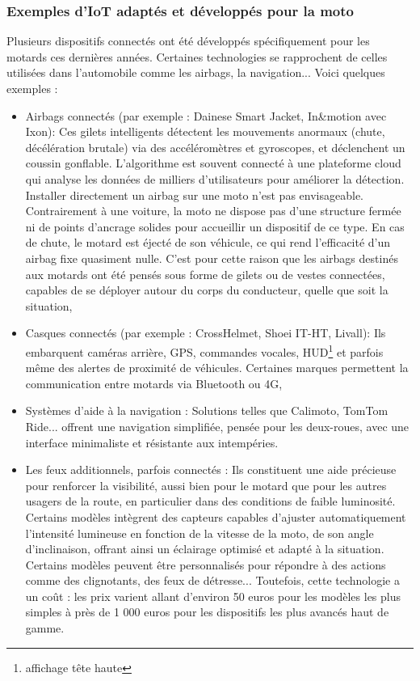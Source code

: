 \subsubsection{Exemples d’IoT adaptés et développés pour la moto}
Plusieurs dispositifs connectés ont été développés spécifiquement pour les motards ces dernières années. Certaines technologies se rapprochent de celles utilisées dans l'automobile comme les airbags, la navigation... Voici quelques exemples :
\begin{itemize}
  \item Airbags connectés (par exemple : Dainese Smart Jacket, In\&motion avec Ixon): Ces gilets intelligents détectent les mouvements anormaux (chute, décélération brutale) via des accéléromètres et gyroscopes, et déclenchent un coussin gonflable. L’algorithme est souvent connecté à une plateforme cloud qui analyse les données de milliers d’utilisateurs pour améliorer la détection. Installer directement un airbag sur une moto n’est pas envisageable. Contrairement à une voiture, la moto ne dispose pas d’une structure fermée ni de points d’ancrage solides pour accueillir un dispositif de ce type. En cas de chute, le motard est éjecté de son véhicule, ce qui rend l’efficacité d’un airbag fixe quasiment nulle. C’est pour cette raison que les airbags destinés aux motards ont été pensés sous forme de gilets ou de vestes connectées, capables de se déployer autour du corps du conducteur, quelle que soit la situation,
  \item Casques connectés (par exemple : CrossHelmet, Shoei IT-HT, Livall): Ils embarquent caméras arrière, GPS, commandes vocales, HUD\footnote{affichage tête haute} et parfois même des alertes de proximité de véhicules. Certaines marques permettent la communication entre motards via Bluetooth ou 4G,
  \item Systèmes d’aide à la navigation : Solutions telles que Calimoto, TomTom Ride... offrent une navigation simplifiée, pensée pour les deux-roues, avec une interface minimaliste et résistante aux intempéries.
  \item Les feux additionnels, parfois connectés : Ils constituent une aide précieuse pour renforcer la visibilité, aussi bien pour le motard que pour les autres usagers de la route, en particulier dans des conditions de faible luminosité. Certains modèles intègrent des capteurs capables d’ajuster automatiquement l’intensité lumineuse en fonction de la vitesse de la moto, de son angle d’inclinaison, offrant ainsi un éclairage optimisé et adapté à la situation. Certains modèles peuvent être personnalisés pour répondre à des actions comme des clignotants, des feux de détresse... Toutefois, cette technologie a un coût : les prix varient allant d’environ 50 euros pour les modèles les plus simples à près de 1 000 euros pour les dispositifs les plus avancés haut de gamme.

\end{itemize}
